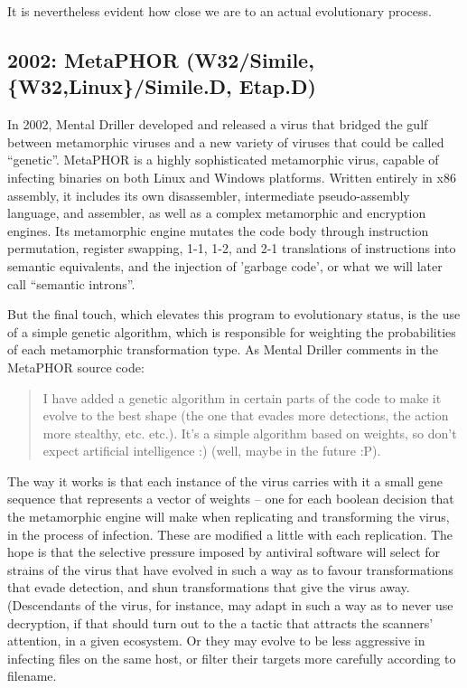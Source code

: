 \documentclass[12pt,glossary]{dalthesis}
\begin{document}
It is nevertheless evident how close we are to an actual evolutionary process.

\subsection{2002: MetaPHOR (W32/Simile, \{W32,Linux\}/Simile.D, Etap.D)}
\label{sec:org5e6fe58}

In 2002, Mental Driller developed and released a virus that bridged the gulf
between metamorphic viruses and a new variety of viruses that could be called
``genetic''. MetaPHOR is a highly sophisticated metamorphic virus, capable of
infecting binaries on both Linux and Windows platforms. Written entirely in x86
assembly, it includes its own disassembler, intermediate pseudo-assembly
language, and assembler, as well as a complex metamorphic and encryption
engines. Its metamorphic engine mutates the code body through instruction
permutation, register swapping, 1-1, 1-2, and 2-1 translations of instructions
into semantic equivalents, and the injection of 'garbage code', or what we will
later call ``semantic introns''.

But the final touch, which elevates this program to evolutionary status, is the
use of a simple genetic algorithm, which is responsible for weighting the
probabilities of each metamorphic transformation type. As Mental Driller
comments in the MetaPHOR source code:

\begin{quote}
  I have added a genetic algorithm in certain parts of the code to make it
evolve to the best shape (the one that evades more detections, the action more
stealthy, etc. etc.). It's a simple algorithm based on weights, so don't expect
artificial intelligence :) (well, maybe in the future :P). 
\end{quote}

 The way it works is that each instance of the virus carries with it a small
gene sequence that represents a vector of weights -- one for each boolean
decision that the metamorphic engine will make when replicating and transforming
the virus, in the process of infection. These are modified a little with each
replication. The hope is that the selective pressure imposed by
antiviral software will select for strains of the virus that have evolved in
such a way as to favour transformations that evade detection, and shun
transformations that give the virus away. (Descendants of the virus, for
instance, may adapt in such a way as to never use decryption, if that should
turn out to the a tactic that attracts the scanners' attention, in a given
ecosystem. Or they may evolve to be less aggressive in infecting files on the
same host, or filter their targets more carefully according to filename.
\end{document}
